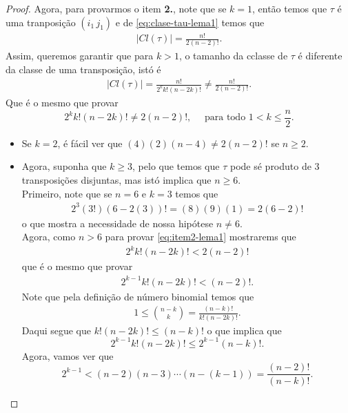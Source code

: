 \begin{proof}
  Agora, para provarmos o item \textbf{2.}, note que se $k=1$, então temos que $\tau$ é uma tranposição $(i_1\,j_1)$ e de \eqref{eq:clase-tau-lema1} temos que
  \begin{align*}
    |Cl(\tau)|=\frac{n!}{2(n-2)!}.
  \end{align*}
  Assim, queremos garantir que para $k>1$, o tamanho da cclasse de $\tau$ é diferente da classe de uma transposição, istó é
  \begin{align*}
    |Cl(\tau)|=\frac{n!}{2^{k}k!(n-2k)!}\neq\frac{n!}{2(n-2)!}.
  \end{align*}
  Que é o mesmo que provar
  \begin{equation}\label{eq:item2-lema1}
    2^{k}k!(n-2k)!\neq 2(n-2)!,\quad\text{ para todo }1<k\leq\frac{n}{2}.
  \end{equation}
  \begin{itemize}
    \item Se $k=2$, é fácil ver que $(4)(2)(n-4)\neq 2(n-2)!$ se $n\geq 2$.
    \item Agora, suponha que $k\geq 3$, pelo que temos que $\tau$ pode sé produto de $3$ transposições disjuntas, mas  istó implica que $n\geq 6$.\\
      Primeiro, note que se $n=6$ e $k=3$ temos que
      \begin{align*}
        2^{3}(3!)(6-2(3))!=(8)(9)(1)=2(6-2)!
      \end{align*}
      o que mostra a necessidade de nossa hipótese $n\neq 6$.\\
      Agora, como $n>6$ para provar \eqref{eq:item2-lema1} mostrarems que
      \begin{align*}
        2^{k}k!(n-2k)!<2(n-2)!
      \end{align*}
      que é o mesmo que provar
      \begin{align*}
        2^{k-1}k!(n-2k)!<(n-2)!.
      \end{align*}
      Note que pela definição de número binomial temos que
      \begin{align*}
        1\leq \binom{n-k}{k}=\frac{(n-k)!}{k!(n-2k)!}.
      \end{align*}
      Daqui segue que $k!(n-2k)!\leq (n-k)!$ o que implica que
      \begin{equation}\label{eq:item2-lema1-2}
        2^{k-1}k!(n-2k)!\leq 2^{k-1}(n-k)!.
      \end{equation}
      Agora, vamos ver que 
      \begin{equation}\label{eq:item2-lema1-3}
        2^{k-1}<(n-2)(n-3)\cdots(n-(k-1))=\frac{(n-2)!}{(n-k)!}.

\end{equation}
\end{itemize}
\end{proof}
